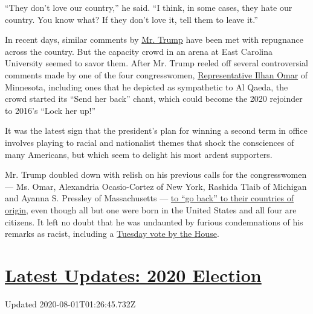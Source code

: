 ``They don't love our country,'' he said. ``I think, in some cases, they
hate our country. You know what? If they don't love it, tell them to
leave it.''

In recent days, similar comments by
\href{https://www.nytimes.com/2019/07/18/us/politics/ilhan-omar-donald-trump.html}{Mr.
Trump} have been met with repugnance across the country. But the
capacity crowd in an arena at East Carolina University seemed to savor
them. After Mr. Trump reeled off several controversial comments made by
one of the four congresswomen,
\href{https://www.nytimes.com/2019/07/18/us/politics/ilhan-omar-donald-trump.html}{Representative
Ilhan Omar} of Minnesota, including ones that he depicted as sympathetic
to Al Qaeda, the crowd started its ``Send her back'' chant, which could
become the 2020 rejoinder to 2016's ``Lock her up!''

It was the latest sign that the president's plan for winning a second
term in office involves playing to racial and nationalist themes that
shock the consciences of many Americans, but which seem to delight his
most ardent supporters.

Mr. Trump doubled down with relish on his previous calls for the
congresswomen --- Ms. Omar, Alexandria Ocasio-Cortez of New York,
Rashida Tlaib of Michigan and Ayanna S. Pressley of Massachusetts ---
\href{https://www.nytimes.com/2019/07/14/us/politics/trump-twitter-squad-congress.html}{to
``go back'' to their countries of origin}, even though all but one were
born in the United States and all four are citizens. It left no doubt
that he was undaunted by furious condemnations of his remarks as racist,
including a
\href{https://www.nytimes.com/2019/07/16/us/politics/trump-tweet-house-vote.html}{Tuesday
vote by the House}.

\hypertarget{latest-updates-2020-election}{%
\section{\texorpdfstring{\href{https://www.nytimes.com/2020/07/31/us/elections/biden-vs-trump.html?action=click\&pgtype=Article\&state=default\&region=MAIN_CONTENT_1\&context=storylines_live_updates}{Latest
Updates: 2020
Election}}{Latest Updates: 2020 Election}}\label{latest-updates-2020-election}}

Updated 2020-08-01T01:26:45.732Z

